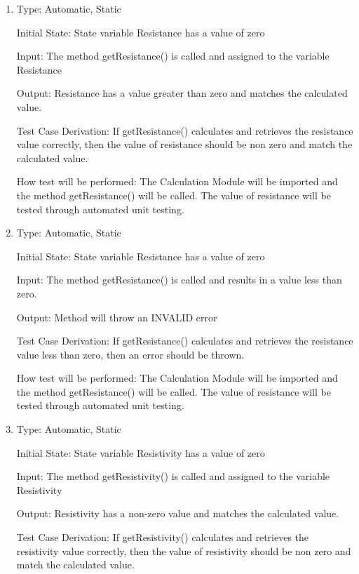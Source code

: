 \documentclass[12pt, titlepage]{article}
\begin{document}
\begin{enumerate}[{UT-C}1.]

  \item
  
  Type: Automatic, Static 

  Initial State: State variable Resistance has a value of zero

  Input: The method getResistance() is called and assigned to the variable Resistance  

  Output: Resistance has a value greater than zero and matches the calculated value.

  Test Case Derivation: If getResistance() calculates and retrieves the resistance value correctly, then the value of resistance should be non zero and match the calculated value.

  How test will be performed: The Calculation Module will be imported and the method getResistance() will be called. 
  The value of resistance will be tested through automated unit testing.

  \item
  
  Type: Automatic, Static 

  Initial State: State variable Resistance has a value of zero

  Input: The method getResistance() is called and results in a value less than zero.

  Output: Method will throw an INVALID error

  Test Case Derivation: If getResistance() calculates and retrieves the resistance value less than zero, then an error should be thrown.

  How test will be performed: The Calculation Module will be imported and the method getResistance() will be called. 
  The value of resistance will be tested through automated unit testing.
            
  \item
  
  Type: Automatic, Static 

  Initial State: State variable Resistivity has a value of zero

  Input: The method getResistivity() is called and assigned to the variable Resistivity

  Output: Resistivity has a non-zero value and matches the calculated value. 

  Test Case Derivation: If getResistivity() calculates and retrieves the resistivity value correctly, then the value of resistivity should be non zero and match the calculated value.


\end{enumerate}
\end{document}
